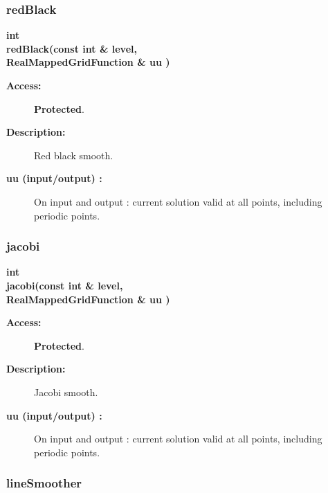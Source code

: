 \subsubsection{redBlack}
 
\begin{flushleft} \textbf{%
int  \\ 
\settowidth{\EllipticGridGeneratorIncludeArgIndent}{redBlack(}%
redBlack(const int \& level, \\ 
\hspace{\EllipticGridGeneratorIncludeArgIndent}RealMappedGridFunction \& uu )
}\end{flushleft}
\begin{description}
\item[{\bf Access:}]  {\bf Protected}.
\item[{\bf Description:}] 
     Red black smooth.
\item[{\bf uu (input/output) :}]  On input and output : current solution valid at all points, including periodic points.

\end{description}
\subsubsection{jacobi}
 
\begin{flushleft} \textbf{%
int  \\ 
\settowidth{\EllipticGridGeneratorIncludeArgIndent}{jacobi(}%
jacobi(const int \& level, \\ 
\hspace{\EllipticGridGeneratorIncludeArgIndent}RealMappedGridFunction \& uu )
}\end{flushleft}
\begin{description}
\item[{\bf Access:}]  {\bf Protected}.
\item[{\bf Description:}] 
     Jacobi smooth.
\item[{\bf uu (input/output) :}]  On input and output : current solution valid at all points, including periodic points.

\end{description}
\subsubsection{lineSmoother}
 

